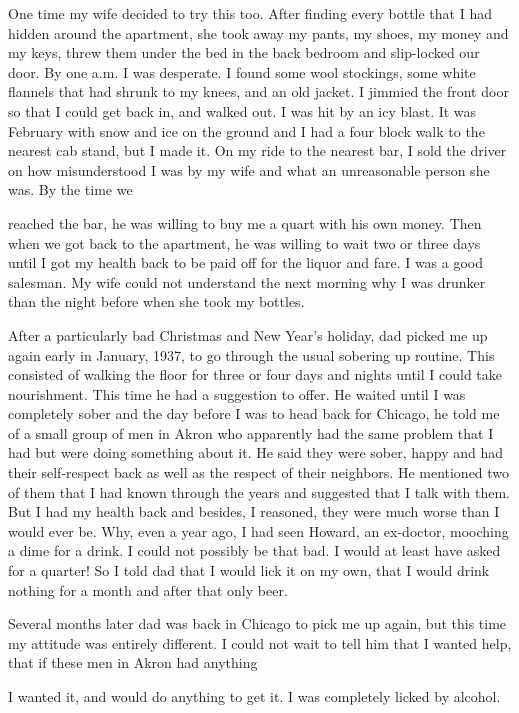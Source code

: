 \begin{biblechapter}
One time my wife decided to try this too. After finding every bottle that I had hidden around the apartment, she took away my pants, my shoes, my money and my keys, threw them under the bed in the back bedroom and slip-locked our door. By one a.m. I was desperate. I found some wool stockings, some white flannels that had shrunk to my knees, and an old jacket. I jimmied the front door so that I could get back in, and walked out. I was hit by an icy blast. It was February with snow and ice on the ground and I had a four block walk to the nearest cab stand, but I made it. On my ride to the nearest bar, I sold the driver on how misunderstood I was by my wife and what an unreasonable person she was. By the time we

reached the bar, he was willing to buy me a quart with his own money. Then when we got back to the apartment, he was willing to wait two or three days until I got my health back to be paid off for the liquor and fare. I was a good salesman. My wife could not understand the next morning why I was drunker than the night before when she took my bottles.

After a particularly bad Christmas and New Year’s holiday, dad picked me up again early in January, 1937, to go through the usual sobering up routine. This consisted of walking the floor for three or four days and nights until I could take nourishment. This time he had a suggestion to offer. He waited until I was completely sober and the day before I was to head back for Chicago, he told me of a small group of men in Akron who apparently had the same problem that I had but were doing something about it. He said they were sober, happy and had their self-respect back as well as the respect of their neighbors. He mentioned two of them that I had known through the years and suggested that I talk with them. But I had my health back and besides, I reasoned, they were much worse than I would ever be. Why, even a year ago, I had seen Howard, an ex-doctor, mooching a dime for a drink. I could not possibly be that bad. I would at least have asked for a quarter! So I told dad that I would lick it on my own, that I would drink nothing for a month and after that only beer.

Several months later dad was back in Chicago to pick me up again, but this time my attitude was entirely different. I could not wait to tell him that I wanted help, that if these men in Akron had anything

I wanted it, and would do anything to get it. I was completely licked by alcohol.


\end{biblechapter}
